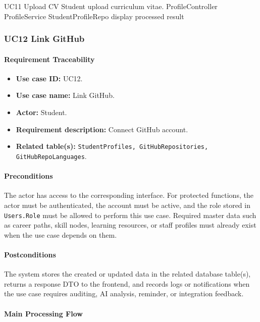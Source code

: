 \SequenceDiagram
{UC11 Upload CV}
{Student}
{upload curriculum vitae.}
{ProfileController}
{ProfileService}
{StudentProfileRepo}
{display processed result}

\subsubsection{UC12 Link GitHub}

\paragraph{Requirement Traceability}

\begin{itemize}
    \item \textbf{Use case ID:} UC12.
    \item \textbf{Use case name:} Link GitHub.
    \item \textbf{Actor:} Student.
    \item \textbf{Requirement description:} Connect GitHub account.
    \item \textbf{Related table(s):} \texttt{StudentProfiles, GitHubRepositories, GitHubRepoLanguages}.
\end{itemize}

\paragraph{Preconditions}

The actor has access to the corresponding interface. For protected functions, the actor must be authenticated, the account must be active, and the role stored in \texttt{Users.Role} must be allowed to perform this use case. Required master data such as career paths, skill nodes, learning resources, or staff profiles must already exist when the use case depends on them.

\paragraph{Postconditions}

The system stores the created or updated data in the related database table(s), returns a response DTO to the frontend, and records logs or notifications when the use case requires auditing, AI analysis, reminder, or integration feedback.

\paragraph{Main Processing Flow}

